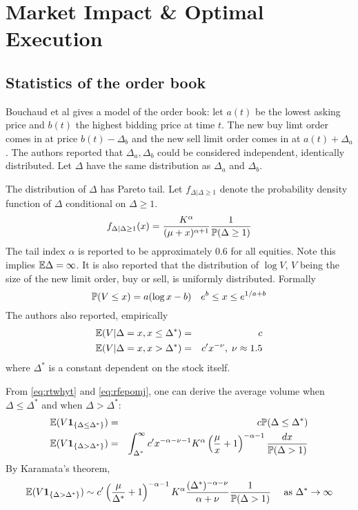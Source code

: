 \chapter{Market Impact \& Optimal Execution}
\section{Statistics of the order book}
Bouchaud et al \cite{BouchaudMezardPotters2002} gives a model of the
order book: let $a(t)$ be the lowest asking price and $b(t)$ the
highest bidding price at time $t$. The new buy limt order comes in at
price $b(t) - \Delta_b$ and the new sell limit order comes in at
$a(t) + \Delta_a$. The authors reported that $\Delta_a, \Delta_b$
could be considered independent, identically distributed. Let
$\Delta$ have the same distribution as $\Delta_a$ and $\Delta_b$.

The distribution of $\Delta$ has Pareto tail. Let
$f_{\Delta | \Delta \geq 1}$ denote the probability density function
of $\Delta$ conditional on $\Delta \geq 1$.
\begin{equation}
  \label{eq:rtwhyt}
  f_{\Delta | \Delta \geq 1}(x) = {
    K^\alpha
    \over
    (\mu + x)^{\alpha + 1}
  } \frac{1}{\P(\Delta \geq 1)}
\end{equation}
The tail index $\alpha$ is reported to be approximately $0.6$ for all
equities. Note this implies $\mathbb{E} \Delta = \infty$. It is also reported
that the distribution of $\log V$, $V$ being the size of the new limit
order, buy or sell, is uniformly distributed. Formally
\begin{equation}
  \label{eq:pojfg}
  \P(V \leq x) = a(\log x - b)
  \quad
  e^b \leq x \leq e^{1/a + b}
\end{equation}
The authors also reported, empirically
\begin{eqnarray}
  \mathbb{E}(V|\Delta = x, x \leq \Delta^*) &=& c \nonumber \\
  \mathbb{E}(V|\Delta = x, x > \Delta^*) &=& c' x^{-\nu},\; \nu \approx 1.5 \label{eq:rfepomj}
\end{eqnarray}
where $\Delta^*$ is a constant dependent on the stock itself.

From \eqref{eq:rtwhyt} and \eqref{eq:rfepomj}, one can derive the average
volume when $\Delta \leq \Delta^*$ and when $\Delta > \Delta^*$:
\begin{eqnarray*}
  \mathbb{E}(V \mathbf{1}_{\{\Delta \leq \Delta^*\}}) &=& c \mathbb{P}(\Delta \leq \Delta^*) \\
  \mathbb{E}(V \mathbf{1}_{\{\Delta > \Delta^*\}}) &=& \int_{\Delta^*}^\infty c' x^{
                                  -\alpha - \nu - 1
                                  } K^\alpha \left(
                                  \frac{\mu}{x} + 1
                                  \right)^{-\alpha - 1}
                                  \frac{dx}{\mathbb{P}(\Delta > 1)}
\end{eqnarray*}
By Karamata's theorem,
\[
  \mathbb{E}(V \mathbf{1}_{\{\Delta > \Delta^*\}}) \sim c' \left(
    {\mu \over \Delta^*} + 1
  \right)^{-\alpha - 1} K^\alpha
  {(\Delta^*)^{-\alpha-\nu} \over \alpha + \nu}
  {1 \over  \mathbb{P} (\Delta > 1)}
  \quad
  \text{ as }
  \Delta^* \to \infty
\]


